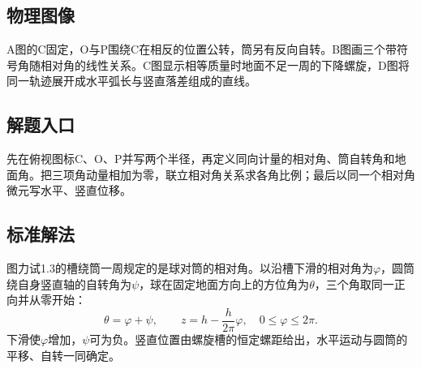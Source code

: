 \documentclass[UTF8,fontset=fandol,a4paper,11pt]{ctexart}
\begin{document}
\subsection*{物理图像}

A图的C固定，O与P围绕C在相反的位置公转，筒另有反向自转。B图画三个带符号角随相对角的线性关系。C图显示相等质量时地面不足一周的下降螺旋，D图将同一轨迹展开成水平弧长与竖直落差组成的直线。



\subsection*{解题入口}

先在俯视图标C、O、P并写两个半径，再定义同向计量的相对角、筒自转角和地面角。把三项角动量相加为零，联立相对角关系求各角比例；最后以同一个相对角微元写水平、竖直位移。



\subsection*{标准解法}


图力试1.3的槽绕筒一周规定的是球对筒的相对角。以沿槽下滑的相对角为$\varphi$，圆筒绕自身竖直轴的自转角为$\psi$，球在固定地面方向上的方位角为$\theta$，三个角取同一正向并从零开始：
\[
\theta=\varphi+\psi,\qquad
z=h-\frac{h}{2\pi}\varphi,\quad 0\le\varphi\le2\pi.
\]
下滑使$\varphi$增加，$\psi$可为负。竖直位置由螺旋槽的恒定螺距给出，水平运动与圆筒的平移、自转一同确定。
\end{document}
